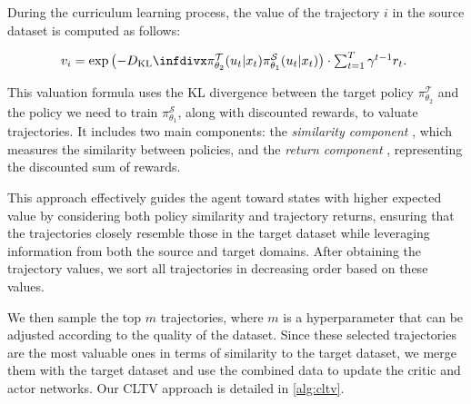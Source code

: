 During the curriculum learning process, the value of the trajectory \(i\) in the source dataset is computed as follows:

\begin{equation}
\resizebox{0.8\hsize}{!}{%
\begin{math}
v_i = \exp\left(-\infdiv{\pi_{\theta_2}^{\mathcal{T}}(u_t|x_t)}{\pi_{\theta_1}^{\mathcal{S}}(u_t|x_t)}\right) \cdot \sum_{t=1}^{T} \gamma^{t-1} r_t.
\end{math}
}
\end{equation}


This valuation formula uses the KL divergence between the target policy \(\pi_{\theta_2}^{\mathcal{T}}\) and the policy we need to train \(\pi_{\theta_1}^{\mathcal{S}}\), along with discounted rewards, to valuate trajectories. It includes two main components: the \emph{similarity component} , which measures the similarity between policies, and the \emph{return component} , representing the discounted sum of rewards. 


This approach effectively guides the agent toward states with higher expected value by considering both policy similarity and trajectory returns, ensuring that the trajectories closely resemble those in the target dataset while leveraging information from both the source and target domains. After obtaining the trajectory values, we sort all trajectories in decreasing order based on these values. 

We then sample the top \(m\) trajectories, where \(m\) is a hyperparameter that can be adjusted according to the quality of the dataset. Since these selected trajectories are the most valuable ones in terms of similarity to the target dataset, we merge them with the target dataset and use the combined data to update the critic and actor networks. Our CLTV approach is detailed in \autoref{alg:cltv}.


